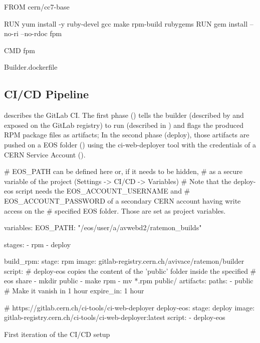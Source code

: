 \begin{listing}[ht]
\begin{yamlcode}
FROM cern/cc7-base

RUN yum install -y ruby-devel gcc make rpm-build rubygems
RUN gem install --no-ri --no-rdoc fpm

CMD fpm
\end{yamlcode}
\caption{Builder.dockerfile}
\end{listing}


\subsection{CI/CD Pipeline}

 describes the GitLab CI. The first phase () tells the builder (described by  and exposed on the GitLab registry) to run  (described in ) and flags the produced RPM package files as artifacts; In the second phase (deploy), those artifacts are pushed on a EOS folder () using the ci-web-deployer tool with the credentials of a CERN Service Account ().


\begin{listing}[ht]
\begin{yamlcode}

# EOS_PATH can be defined here or, if it needs to be hidden, 
# as a secure variable of the project (Settings -> CI/CD -> Variables)
# Note that the deploy-eos script needs the EOS_ACCOUNT_USERNAME and 
# EOS_ACCOUNT_PASSWORD of a secondary CERN account having write access on the
# specified EOS folder. Those are set as project variables.

variables:
  EOS_PATH: "/eos/user/a/avwebd2/ratemon_builds"

stages:
  - rpm
  - deploy

build_rpm:
  stage: rpm
  image: gitlab-registry.cern.ch/avivace/ratemon/builder
  script:
    # deploy-eos copies the content of the 'public' folder inside the specified
    # eos share
    - mkdir public
    - make rpm
    - mv *.rpm public/
  artifacts:
    paths:
      - public
    # Make it vanish in 1 hour
    expire_in: 1 hour

# https://gitlab.cern.ch/ci-tools/ci-web-deployer
deploy-eos:
  stage: deploy
  image: gitlab-registry.cern.ch/ci-tools/ci-web-deployer:latest
  script:
    - deploy-eos

\end{yamlcode}
\caption{First iteration of the CI/CD setup}
\end{listing}

